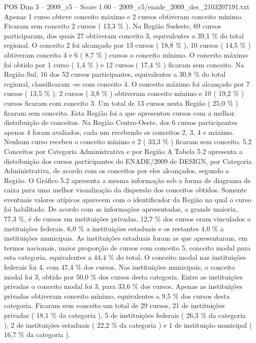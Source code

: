 \begin{textsample}{POS Dim 3 – 2009\_c5 – Score 1.00 – 2009\_c5/enade\_2009\_des\_2103207191.txt}
Apenas 1 curso obteve conceito máximo e 2 cursos obtiveram conceito mínimo.
Ficaram sem conceito 2 cursos ( 13,3 \% ).
Na Região Sudeste, 69 cursos participaram, dos quais 27 obtiveram conceito 3, equivalentes a 39,1 \% do total regional.
O conceito 2 foi alcançado por 13 cursos ( 18,8 \% ), 10 cursos ( 14,5 \% ) obtiveram conceito 4 e 6 ( 8,7 \% ) cursos o conceito mínimo.
O conceito máximo foi obtido por 1 curso ( 1,4 \% ) e 12 cursos ( 17,4 \% ) ficaram sem conceito.
Na Região Sul, 16 dos 52 cursos participantes, equivalentes a 30,8 \% do total regional, classificaram -se com conceito 4.
O conceito máximo foi alcançado por 7 cursos ( 13,5 \% ), 2 cursos ( 3,8 \% ) obtiveram conceito mínimo e 10 ( 19,2 \% ) cursos ficaram com conceito 3.
Um total de 13 cursos nesta Região ( 25,0 \% ) ficaram sem conceito.
Esta Região foi a que apresentou cursos com a melhor distribuição de conceitos.
Na Região Centro-Oeste, dos 6 cursos participantes apenas 4 foram avaliados, cada um recebendo os conceitos 2, 3, 4 e máximo.
Nenhum curso recebeu o conceito mínimo e 2 ( 33,3 \% ) ficaram sem conceito. 5.2 Conceitos por Categoria Administrativa e por Região A Tabela 5.2 apresenta a distribuição dos cursos participantes do ENADE/2009 de DESIGN, por Categoria Administrativa, de acordo com os conceitos por eles alcançados, segundo a Região.
O Gráfico 5.2 apresenta a mesma informação sob a forma de diagrama de caixa para uma melhor visualização da dispersão dos conceitos obtidos.
Somente eventuais valores atípicos aparecem com o identificador da Região na qual o curso foi habilitado.
De acordo com as informações apresentadas, a grande maioria, 77,3 \%, é de cursos em instituições privadas, 12,7 \% dos cursos eram vinculados a instituições federais, 6,0 \% a instituições estaduais e os restantes 4,0 \% a instituições municipais.
As instituições estaduais foram as que apresentaram, em termos nacionais, maior proporção de cursos com conceito 5, conceito modal para esta categoria, equivalentes a 44,4 \% do total.
O conceito modal nas instituições federais foi 4, com 47,4 \% dos cursos.
Nas instituições municipais, o conceito modal foi 3, obtido por 50,0 \% dos cursos desta categoria.
Entre as instituições privadas o conceito modal foi 3, para 33,6 \% dos cursos.
Apenas as instituições privadas obtiveram conceito mínimo, equivalentes a 9,5 \% dos cursos desta categoria.
Ficaram sem conceito um total de 29 cursos, 21 de instituições privadas ( 18,1 \% da categoria ), 5 de instituições federais ( 26,3 \% da categoria ), 2 de instituições estaduais ( 22,2 \% da categoria ) e 1 de instituição municipal ( 16,7 \% da categoria ).

\end{textsample}
